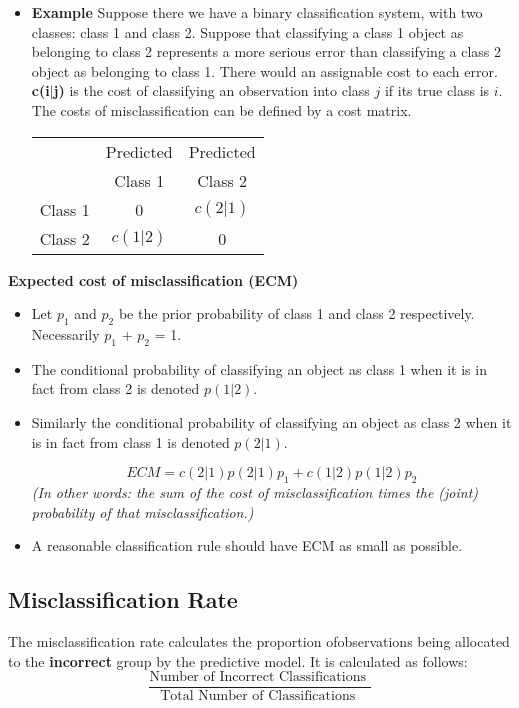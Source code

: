 \begin{itemize}
	\item 	\textbf{Example} Suppose there we have a binary classification system, with two classes: class 1 and class 2.
	Suppose that classifying a class 1 object as belonging to class 2 represents a more serious error than classifying a class 2 object as belonging to class 1. There would an assignable cost to each error.
	\textbf{c(i$|$j)} is the cost of classifying an observation into class $j$ if its true class is $i$.
	The costs of misclassification can be defined by a cost matrix.
	
	\begin{center}
	\begin{tabular}{|c|c|c|}
		\hline
		& Predicted & Predicted \\
		& Class 1 & Class 2 \\  \hline
		Class 1 & 0 & $c(2|1)$  \\ \hline
		Class 2 & $c(1|2)$ & 0 \\
		\hline
	\end{tabular}
	\end{center}
	
\end{itemize}

\noindent \textbf{Expected cost of misclassification (ECM)}
\begin{itemize}
	\item Let $p_1$ and $p_2$ be the prior probability of class 1 and class 2 respectively.
	Necessarily $p_1$ + $p_2$ = 1.
	
\item	The conditional probability of classifying an object as class 1 when it is in fact from
	class 2 is denoted $p(1|2)$.
\item 	Similarly the conditional probability of classifying an object as class 2 when it is in
	fact from class 1 is denoted $p(2|1)$.
	
	\[ECM = c(2|1)p(2|1)p_1 + c(1|2)p(1|2)p_2\]
\textit{(In other words: the sum of the cost of misclassification times the (joint) probability of that misclassification.)}
	
\item 	A reasonable classification rule should have ECM as small as possible.
\end{itemize}


\subsection{Misclassification Rate}
The misclassification rate calculates the proportion ofobservations being allocated to the \textbf{incorrect} group by the predictive model. It is calculated as follows:
\[ \frac{
\mbox{Number of Incorrect Classifications }}{\mbox{Total Number of Classifications }} \]

